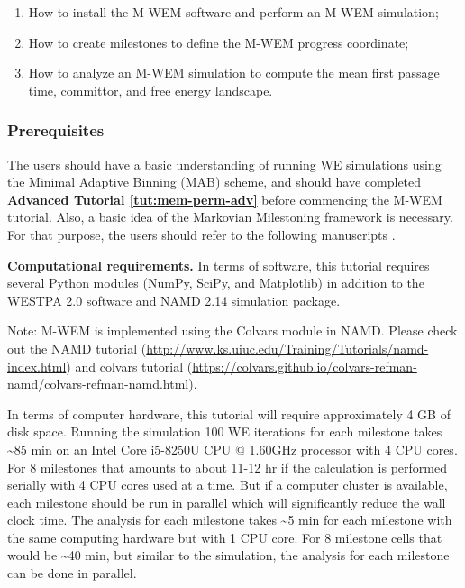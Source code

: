 \begin{enumerate}
  \item How to install the M-WEM software and perform an M-WEM simulation;
  \item How to create milestones to define the M-WEM progress coordinate;
  \item How to analyze an M-WEM simulation to compute the mean first passage time, committor, and free energy landscape. 
\end{enumerate}

\subsubsection{Prerequisites}

The users should have a basic understanding of running WE simulations using the Minimal Adaptive Binning (MAB) scheme, and should have completed \textbf{Advanced Tutorial \ref{tut:mem-perm-adv}} before commencing the M-WEM tutorial. 
Also, a basic idea of the Markovian Milestoning framework is necessary. 
For that purpose, the users should refer to the following manuscripts \cite{Vanden-Eijnden2009Markovian, Maragliano2009Free, Ray2022Markovian}.

\textbf{Computational requirements.} In terms of software, this tutorial requires several Python modules (NumPy, SciPy, and Matplotlib) in addition to the WESTPA 2.0 software and NAMD 2.14 simulation package. 

\noindent Note: M-WEM is implemented using the Colvars module in NAMD. 
Please check out the NAMD tutorial ({\url{http://www.ks.uiuc.edu/Training/Tutorials/namd-index.html}}) and colvars tutorial ({\url{https://colvars.github.io/colvars-refman-namd/colvars-refman-namd.html}}).
 
In terms of computer hardware, this tutorial will require approximately 4 GB of disk space. 
Running the simulation 100 WE iterations for each milestone takes \textasciitilde85 min on an Intel Core i5-8250U CPU @ 1.60GHz processor with 4 CPU cores. 
For 8 milestones that amounts to about 11-12 hr if the calculation is performed serially with 4 CPU cores used at a time. 
But if a computer cluster is available, each milestone should be run in parallel which will significantly reduce the wall clock time. 
The analysis for each milestone takes \textasciitilde5 min for each milestone with the same computing hardware but with 1 CPU core. 
For 8 milestone cells that would be \textasciitilde40 min, but similar to the simulation, the analysis for each milestone can be done in parallel.  

